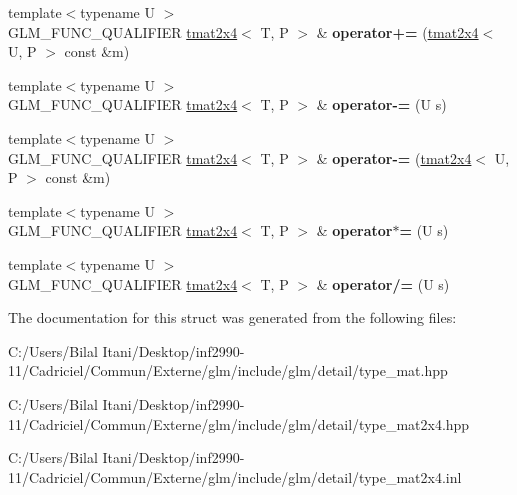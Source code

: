 \begin{DoxyCompactItemize}
\item 
{\footnotesize template$<$typename U $>$ }\\G\+L\+M\+\_\+\+F\+U\+N\+C\+\_\+\+Q\+U\+A\+L\+I\+F\+I\+ER \hyperlink{structglm_1_1detail_1_1tmat2x4}{tmat2x4}$<$ T, P $>$ \& {\bfseries operator+=} (\hyperlink{structglm_1_1detail_1_1tmat2x4}{tmat2x4}$<$ U, P $>$ const \&m)\hypertarget{structglm_1_1detail_1_1tmat2x4_af83887f4894721e8b28d9253fb616700}{}\label{structglm_1_1detail_1_1tmat2x4_af83887f4894721e8b28d9253fb616700}

\item 
{\footnotesize template$<$typename U $>$ }\\G\+L\+M\+\_\+\+F\+U\+N\+C\+\_\+\+Q\+U\+A\+L\+I\+F\+I\+ER \hyperlink{structglm_1_1detail_1_1tmat2x4}{tmat2x4}$<$ T, P $>$ \& {\bfseries operator-\/=} (U s)\hypertarget{structglm_1_1detail_1_1tmat2x4_a0289438555ea967c110a13f4df846953}{}\label{structglm_1_1detail_1_1tmat2x4_a0289438555ea967c110a13f4df846953}

\item 
{\footnotesize template$<$typename U $>$ }\\G\+L\+M\+\_\+\+F\+U\+N\+C\+\_\+\+Q\+U\+A\+L\+I\+F\+I\+ER \hyperlink{structglm_1_1detail_1_1tmat2x4}{tmat2x4}$<$ T, P $>$ \& {\bfseries operator-\/=} (\hyperlink{structglm_1_1detail_1_1tmat2x4}{tmat2x4}$<$ U, P $>$ const \&m)\hypertarget{structglm_1_1detail_1_1tmat2x4_a7f1203e2377c0b0f9e5c1a1bb68006a7}{}\label{structglm_1_1detail_1_1tmat2x4_a7f1203e2377c0b0f9e5c1a1bb68006a7}

\item 
{\footnotesize template$<$typename U $>$ }\\G\+L\+M\+\_\+\+F\+U\+N\+C\+\_\+\+Q\+U\+A\+L\+I\+F\+I\+ER \hyperlink{structglm_1_1detail_1_1tmat2x4}{tmat2x4}$<$ T, P $>$ \& {\bfseries operator$\ast$=} (U s)\hypertarget{structglm_1_1detail_1_1tmat2x4_a3d1fb988d316f24267ca8349b5627be8}{}\label{structglm_1_1detail_1_1tmat2x4_a3d1fb988d316f24267ca8349b5627be8}

\item 
{\footnotesize template$<$typename U $>$ }\\G\+L\+M\+\_\+\+F\+U\+N\+C\+\_\+\+Q\+U\+A\+L\+I\+F\+I\+ER \hyperlink{structglm_1_1detail_1_1tmat2x4}{tmat2x4}$<$ T, P $>$ \& {\bfseries operator/=} (U s)\hypertarget{structglm_1_1detail_1_1tmat2x4_a84f40f6dabc1767c21dd5440f038a363}{}\label{structglm_1_1detail_1_1tmat2x4_a84f40f6dabc1767c21dd5440f038a363}

\end{DoxyCompactItemize}


The documentation for this struct was generated from the following files\+:\begin{DoxyCompactItemize}
\item 
C\+:/\+Users/\+Bilal Itani/\+Desktop/inf2990-\/11/\+Cadriciel/\+Commun/\+Externe/glm/include/glm/detail/type\+\_\+mat.\+hpp\item 
C\+:/\+Users/\+Bilal Itani/\+Desktop/inf2990-\/11/\+Cadriciel/\+Commun/\+Externe/glm/include/glm/detail/type\+\_\+mat2x4.\+hpp\item 
C\+:/\+Users/\+Bilal Itani/\+Desktop/inf2990-\/11/\+Cadriciel/\+Commun/\+Externe/glm/include/glm/detail/type\+\_\+mat2x4.\+inl\end{DoxyCompactItemize}
